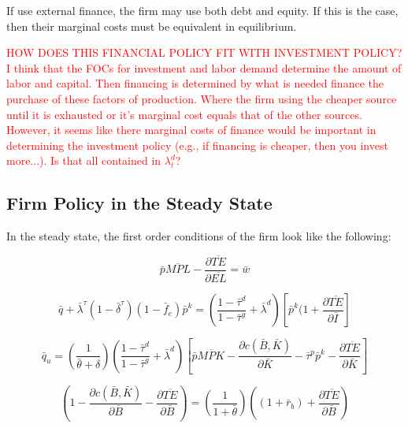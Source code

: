 If use external finance, the firm may use both debt and equity. If this is the case, then their marginal costs must be equivalent in equilibrium.

\textcolor{red}{HOW DOES THIS FINANCIAL POLICY FIT WITH INVESTMENT POLICY?  I think that the FOCs for investment and labor demand determine the amount of labor and capital.  Then financing is determined by what is needed finance the purchase of these factors of production. Where the firm using the cheaper source until it is exhausted or it's marginal cost equals that of the other sources.  However, it seems like there marginal costs of finance would be important in determining the investment policy (e.g., if financing is cheaper, then you invest more...).  Is that all contained in $\lambda^{d}_{t}$?}


\subsection{Firm Policy in the Steady State}

In the steady state, the first order conditions of the firm look like the following:

\begin{equation}
\label{eqn:foc_l_ss}
 \bar{p}\overline{MPL} - \frac{\partial \overline{TE}}{\partial \overline{EL}}= \bar{w}
\end{equation}

 \begin{equation}
\label{eqn:foc_i_ss}
\bar{q} + \bar{\lambda}^{\tau}(1-\bar{\delta}^{\tau})(1-\bar{f}_{e})\bar{p}^{k} =  \left(\frac{1-\bar{\tau}^{d}}{1-\bar{\tau}^{g}} + \bar{\lambda}^{d}\right)\left[\bar{p}^{k}(1 + \frac{\partial \overline{TE}}{\partial \bar{I}}\right]
\end{equation}

 \begin{equation}
\label{eqn:foc_k_ss}
\bar{q}_{u} = \left(\frac{1}{\bar{\theta}+\delta}\right) \left(\frac{1-\bar{\tau}^{d}}{1-\bar{\tau}^{g}} + \bar{\lambda}^{d} \right)\left[\bar{p}\overline{MPK} - \frac{\partial c(\bar{B},\bar{K})}{\partial \bar{K}}-\bar{\tau}^{p}\bar{p}^{k}-\frac{\partial \overline{TE}}{\partial \bar{K}} \right]
\end{equation}


 \begin{equation}
\label{eqn:foc_b_ss}
\left(1-\frac{\partial c(\bar{B},\bar{K})}{\partial \bar{B}}-\frac{\partial \overline{TE}}{\partial \bar{B}}\right)=   \left(\frac{1}{1+\bar{\theta}}\right) \left((1+\bar{r}_{b})+\frac{\partial \overline{TE}}{\partial \bar{B}}\right)
\end{equation}



